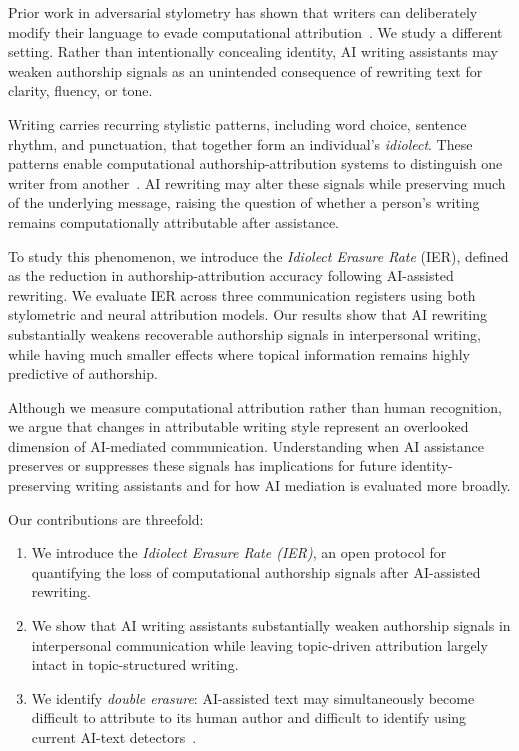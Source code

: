 \documentclass[sigconf,nonacm]{acmart}
\begin{document}
Prior work in adversarial stylometry has shown that writers can deliberately modify
their language to evade computational attribution~\cite{brennan2012,potthast2016,krishna2023}.
We study a different setting. Rather than intentionally concealing identity, AI
writing assistants may weaken authorship signals as an unintended consequence of
rewriting text for clarity, fluency, or tone.

Writing carries recurring stylistic patterns, including word choice, sentence rhythm,
and punctuation, that together form an individual's \emph{idiolect}. These patterns
enable computational authorship-attribution systems to distinguish one writer from
another~\cite{koppel2009}. AI rewriting may alter these signals while preserving much
of the underlying message, raising the question of whether a person's writing remains
computationally attributable after assistance.

To study this phenomenon, we introduce the \emph{Idiolect Erasure Rate} (IER),
defined as the reduction in authorship-attribution accuracy following AI-assisted
rewriting. We evaluate IER across three communication registers using both
stylometric and neural attribution models. Our results show that AI rewriting
substantially weakens recoverable authorship signals in interpersonal writing, while
having much smaller effects where topical information remains highly predictive of
authorship.

Although we measure computational attribution rather than human recognition, we argue
that changes in attributable writing style represent an overlooked dimension of
AI-mediated communication. Understanding when AI assistance preserves or suppresses
these signals has implications for future identity-preserving writing assistants and
for how AI mediation is evaluated more broadly.

Our contributions are threefold:

\begin{enumerate}
\item We introduce the \emph{Idiolect Erasure Rate (IER)}, an open protocol for
quantifying the loss of computational authorship signals after AI-assisted rewriting.

\item We show that AI writing assistants substantially weaken authorship signals in
interpersonal communication while leaving topic-driven attribution largely intact in
topic-structured writing.

\item We identify \emph{double erasure}: AI-assisted text may simultaneously become
difficult to attribute to its human author and difficult to identify using current
AI-text detectors~\cite{sadasivan2023,krishna2023}.
\end{enumerate}
\end{document}
